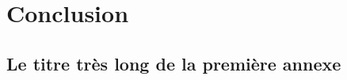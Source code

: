\documentclass[12pt,twoside]{book}
\begin{document}
%




\part{Conclusion}


\appendix %

\chapter[Titre court]{Le titre très long de la première annexe}

%

\newpage{\pagestyle{empty}\cleardoublepage}


\backmatter %

\tableofcontents
\end{document}
